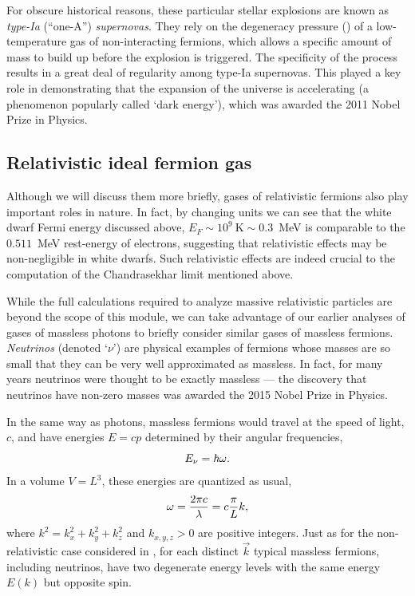 For obscure historical reasons, these particular stellar explosions are known as \textit{type-{\textrm I}a} (``one-A'') \textit{supernovas}.
They rely on the degeneracy pressure () of a low-temperature gas of non-interacting fermions, which allows a specific amount of mass to build up before the explosion is triggered.
The specificity of the process results in a great deal of regularity among type-{\textrm I}a supernovas.
This played a key role in demonstrating that the expansion of the universe is accelerating (a phenomenon popularly called `dark energy'), which was awarded the 2011 Nobel Prize in Physics.



\subsection{Relativistic ideal fermion gas}
Although we will discuss them more briefly, gases of relativistic fermions also play important roles in nature.
In fact, by changing units we can see that the white dwarf Fermi energy discussed above, $E_F \sim 10^9~\text{K} \sim 0.3$~MeV is comparable to the $0.511$~MeV rest-energy of electrons, suggesting that relativistic effects may be non-negligible in white dwarfs. %
Such relativistic effects are indeed crucial to the computation of the Chandrasekhar limit mentioned above.

While the full calculations required to analyze massive relativistic particles are beyond the scope of this module, we can take advantage of our earlier analyses of gases of massless photons to briefly consider similar gases of massless fermions.
\textit{Neutrinos} (denoted `$\nu$') are physical examples of fermions whose masses are so small that they can be very well approximated as massless.
In fact, for many years neutrinos were thought to be exactly massless --- the discovery that neutrinos have non-zero masses was awarded the 2015 Nobel Prize in Physics.

In the same way as photons, massless fermions would travel at the speed of light, $c$, and have energies $E = cp$ determined by their angular frequencies,
\begin{equation*}
  E_{\nu} = \hbar \omega.
\end{equation*}
In a volume $V = L^3$, these energies are quantized as usual,
\begin{equation*}
  \omega = \frac{2\pi c}{\lambda} = c \frac{\pi}{L} k,
\end{equation*}
where $k^2 = k_x^2 + k_y^2 + k_z^2$ and $k_{x, y, z} > 0$ are positive integers.
Just as for the non-relativistic case considered in , for each distinct $\vec k$ typical massless fermions, including neutrinos, have two degenerate energy levels with the same energy $E(k)$ but opposite spin.

